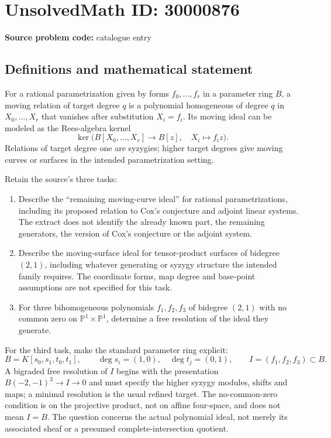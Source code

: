 \documentclass[11pt]{article}
\newcommand{\PP}{\mathbb{P}}
\begin{document}
\section*{UnsolvedMath ID: 30000876}
\textbf{Source problem code:} catalogue entry
\subsection{Definitions and mathematical statement}
For a rational parametrization given by forms $f_0,\ldots,f_r$ in a parameter ring $B$, a moving relation of target degree $q$ is a polynomial homogeneous of degree $q$ in $X_0,\ldots,X_r$ that vanishes after substitution $X_i=f_i$. Its moving ideal can be modeled as the Rees-algebra kernel
\[
\ker\bigl(B[X_0,\ldots,X_r]\longrightarrow B[z],\quad X_i\longmapsto f_i z\bigr).
\]
Relations of target degree one are syzygies; higher target degrees give moving curves or surfaces in the intended parametrization setting.

Retain the source's three tasks:
\begin{enumerate}
\item Describe the ``remaining moving-curve ideal'' for rational parametrizations, including its proposed relation to Cox's conjecture and adjoint linear systems. The extract does not identify the already known part, the remaining generators, the version of Cox's conjecture or the adjoint system.
\item Describe the moving-surface ideal for tensor-product surfaces of bidegree $(2,1)$, including whatever generating or syzygy structure the intended family requires. The coordinate forms, map degree and base-point assumptions are not specified for this task.
\item For three bihomogeneous polynomials $f_1,f_2,f_3$ of bidegree $(2,1)$ with no common zero on $\PP^1\times\PP^1$, determine a free resolution of the ideal they generate.
\end{enumerate}
For the third task, make the standard parameter ring explicit:
\[
B=K[s_0,s_1,t_0,t_1],\qquad
\deg s_i=(1,0),\quad\deg t_j=(0,1),\qquad
I=(f_1,f_2,f_3)\subset B.
\]
A bigraded free resolution of $I$ begins with the presentation $B(-2,-1)^3\to I\to0$ and must specify the higher syzygy modules, shifts and maps; a minimal resolution is the usual refined target. The no-common-zero condition is on the projective product, not on affine four-space, and does not mean $I=B$. The question concerns the actual polynomial ideal, not merely its associated sheaf or a presumed complete-intersection quotient.
\end{document}
